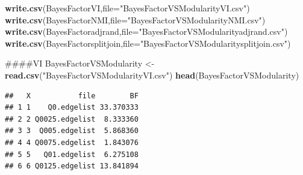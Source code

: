 \documentclass[]{article}
\newenvironment{Shaded}{\begin{snugshade}}{\end{snugshade}}
\newcommand{\KeywordTok}[1]{\textcolor[rgb]{0.13,0.29,0.53}{\textbf{#1}}}
\newcommand{\DataTypeTok}[1]{\textcolor[rgb]{0.13,0.29,0.53}{#1}}
\newcommand{\DecValTok}[1]{\textcolor[rgb]{0.00,0.00,0.81}{#1}}
\newcommand{\FloatTok}[1]{\textcolor[rgb]{0.00,0.00,0.81}{#1}}
\newcommand{\StringTok}[1]{\textcolor[rgb]{0.31,0.60,0.02}{#1}}
\newcommand{\OperatorTok}[1]{\textcolor[rgb]{0.81,0.36,0.00}{\textbf{#1}}}
\newcommand{\NormalTok}[1]{#1}
\begin{document}
\begin{Shaded}
\begin{Highlighting}[]
\KeywordTok{write.csv}\NormalTok{(BayesFactorVI,}\DataTypeTok{file=}\StringTok{"BayesFactorVSModularityVI.csv"}\NormalTok{)}
\KeywordTok{write.csv}\NormalTok{(BayesFactorNMI,}\DataTypeTok{file=}\StringTok{"BayesFactorVSModularityNMI.csv"}\NormalTok{)}
\KeywordTok{write.csv}\NormalTok{(BayesFactoradjrand,}\DataTypeTok{file=}\StringTok{"BayesFactorVSModularityadjrand.csv"}\NormalTok{)}
\KeywordTok{write.csv}\NormalTok{(BayesFactorsplitjoin,}\DataTypeTok{file=}\StringTok{"BayesFactorVSModularitysplitjoin.csv"}\NormalTok{)}


\NormalTok{####VI}
\NormalTok{BayesFactorVSModularity <-}\StringTok{ }\KeywordTok{read.csv}\NormalTok{(}\StringTok{"BayesFactorVSModularityVI.csv"}\NormalTok{)}
\KeywordTok{head}\NormalTok{(BayesFactorVSModularity)}
\end{Highlighting}
\end{Shaded}

\begin{verbatim}
##   X           file        BF
## 1 1    Q0.edgelist 33.370333
## 2 2 Q0025.edgelist  8.333360
## 3 3  Q005.edgelist  5.868360
## 4 4 Q0075.edgelist  1.843076
## 5 5   Q01.edgelist  6.275108
## 6 6 Q0125.edgelist 13.841894
\end{verbatim}

\begin{Shaded}
\end{Shaded}
\end{document}
